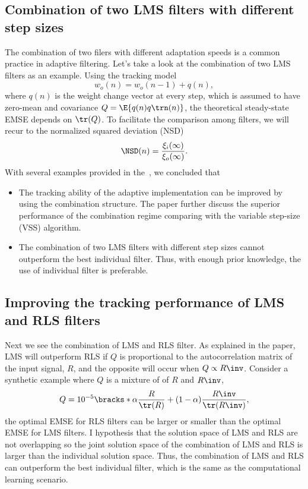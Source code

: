 \documentclass{article}
\begin{document}
\subsection{Combination of two LMS filters with different step sizes}
The combination of two filers with different adaptation speeds is a common practice in adaptive filtering. Let's take a look at the combination of two LMS filters as an example. 
Using the tracking model
\begin{equation}
    w_o(n)=w_o(n-1)+q(n),
\end{equation}
where $q(n)$ is the weight change vector at every step, which is assumed to have zero-mean and covariance $Q=\E{q(n)q\trn(n)}$, the theoretical steady-state EMSE depends on $\tr(Q)$. To facilitate the comparison among filters, we will recur to the normalized squared deviation (NSD)
\begin{equation}
    \NSD(n)=\frac{\xi_i(\infty)}{\xi_o(\infty)}.
\end{equation}
With several examples provided in the~\cite{Arenas_Garcia_2016}, we concluded that
\begin{itemize}
    \item The tracking ability of the adaptive implementation can be improved by using the combination structure. The paper further discuss the superior performance of the combination regime comparing with the variable step-size (VSS) algorithm.
    \item The combination of two LMS filters with different step sizes cannot outperform the best individual filter. Thus, with enough prior knowledge, the use of individual filter is preferable.
\end{itemize}

\subsection{Improving the tracking performance of LMS and RLS filters}
Next we see the combination of LMS and RLS filter. As explained in the paper, LMS will outperform RLS if $Q$ is proportional to the autocorrelation matrix of the input signal, $R$, and the opposite will occur when $Q \propto R\inv$. Consider a synthetic example where $Q$ is a mixture of of $R$ and $R\inv$,
\begin{equation}
    Q=10^{-5}\bracks*{\alpha\frac{R}{\tr(R)}+(1-\alpha)\frac{R\inv}{\tr(R\inv)}},
\end{equation}
the optimal EMSE for RLS filters can be larger or smaller than the optimal EMSE for LMS filters. I hypothesis that the solution space of LMS and RLS are not overlapping so the joint solution space of the combination of LMS and RLS is larger than the individual solution space. Thus, the combination of LMS and RLS can outperform the best individual filter, which is the same as the computational learning scenario.
\end{document}

